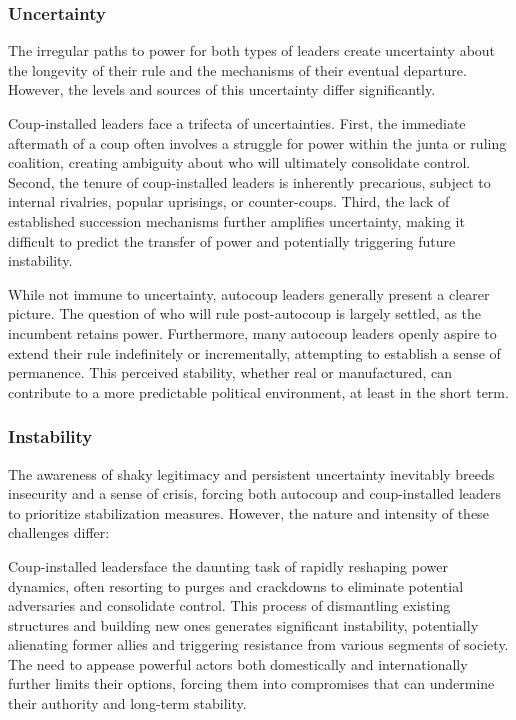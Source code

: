 \documentclass[
  12pt,
]{report}
\begin{document}
\subsubsection*{Uncertainty}\label{uncertainty}

The irregular paths to power for both types of leaders create
uncertainty about the longevity of their rule and the mechanisms of
their eventual departure. However, the levels and sources of this
uncertainty differ significantly.

Coup-installed leaders face a trifecta of uncertainties. First, the
immediate aftermath of a coup often involves a struggle for power within
the junta or ruling coalition, creating ambiguity about who will
ultimately consolidate control. Second, the tenure of coup-installed
leaders is inherently precarious, subject to internal rivalries, popular
uprisings, or counter-coups. Third, the lack of established succession
mechanisms further amplifies uncertainty, making it difficult to predict
the transfer of power and potentially triggering future instability.

While not immune to uncertainty, autocoup leaders generally present a
clearer picture. The question of who will rule post-autocoup is largely
settled, as the incumbent retains power. Furthermore, many autocoup
leaders openly aspire to extend their rule indefinitely or
incrementally, attempting to establish a sense of permanence. This
perceived stability, whether real or manufactured, can contribute to a
more predictable political environment, at least in the short term.

\subsubsection*{Instability}\label{instability}

The awareness of shaky legitimacy and persistent uncertainty inevitably
breeds insecurity and a sense of crisis, forcing both autocoup and
coup-installed leaders to prioritize stabilization measures. However,
the nature and intensity of these challenges differ:

Coup-installed leadersface the daunting task of rapidly reshaping power
dynamics, often resorting to purges and crackdowns to eliminate
potential adversaries and consolidate control. This process of
dismantling existing structures and building new ones generates
significant instability, potentially alienating former allies and
triggering resistance from various segments of society. The need to
appease powerful actors both domestically and internationally further
limits their options, forcing them into compromises that can undermine
their authority and long-term stability.
\end{document}
